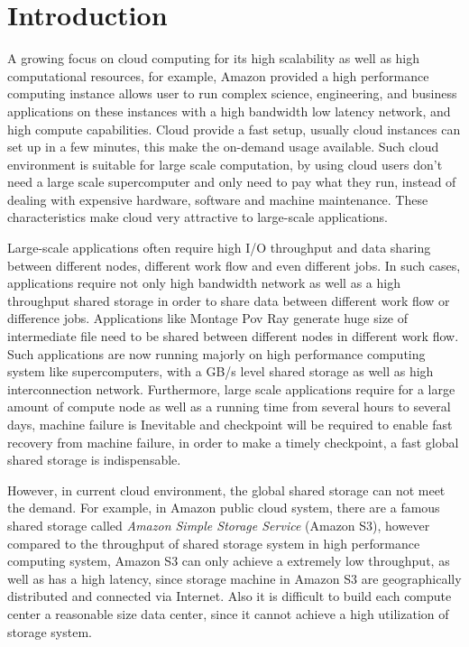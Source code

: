 \section{Introduction}
\label{sec:introduction}
A growing focus on cloud computing for its high scalability as well as high computational
resources, for example, Amazon provided a high performance computing instance allows user to run
complex science, engineering, and business applications on these instances with a high bandwidth low latency
network, and high compute capabilities.
Cloud provide a fast setup, usually cloud instances can set up in a few minutes, this
make the on-demand usage available.
Such cloud environment is suitable for large scale
computation, by using cloud users don't need a large scale supercomputer and only need to pay
what they run, instead of dealing with expensive hardware, software and machine maintenance.
These characteristics make cloud very attractive to large-scale applications.

Large-scale applications often require high I/O
throughput and data sharing between different nodes, different work flow and even different jobs.
In such cases, applications require not only high bandwidth network as well as a high throughput
shared storage in order to share data between different work flow or difference jobs.
Applications like Montage\cite{montage} Pov Ray\cite{povray} generate huge size of intermediate file
need to be shared between different nodes in different work flow.
Such applications are now running majorly on high performance computing system like supercomputers,
with a GB/s level shared storage as well as high interconnection network.
Furthermore, large scale applications require for a large amount of compute node as well as a
running time from several hours to several days, machine failure is Inevitable and checkpoint will be required to enable
fast recovery from machine failure\cite{checkpointing}, in order to make a timely checkpoint, a
fast global shared storage is indispensable.

However, in current cloud environment, the global shared storage can not meet the demand.
For example, in Amazon public cloud system, there are a famous shared storage called \emph{Amazon
Simple Storage Service} (Amazon S3)\cite{AMAZON_AWS}, however compared to the throughput of shared
storage system in high performance computing system, Amazon S3 can only achieve a extremely low throughput,
as well as has a high latency, since storage machine in Amazon S3 are geographically distributed and connected via Internet.
Also it is difficult to build each compute center a reasonable size data center, since it cannot
achieve a high utilization of storage system.

